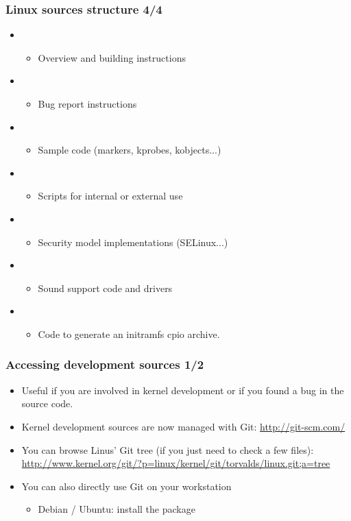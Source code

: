 \begin{frame}
  \frametitle{Linux sources structure 4/4}
  \begin{itemize}
  \item {}
    \begin{itemize}
    \item Overview and building instructions
    \end{itemize}
  \item {}
    \begin{itemize}
    \item Bug report instructions
    \end{itemize}
  \item {}
    \begin{itemize}
    \item Sample code (markers, kprobes, kobjects...)
    \end{itemize}
  \item {}
    \begin{itemize}
    \item Scripts for internal or external use
    \end{itemize}
  \item {}
    \begin{itemize}
    \item Security model implementations (SELinux...)
    \end{itemize}
  \item {}
    \begin{itemize}
    \item Sound support code and drivers
    \end{itemize}
  \item {}
    \begin{itemize}
    \item Code to generate an initramfs cpio archive.
    \end{itemize}
  \end{itemize}
\end{frame}

\begin{frame}
  \frametitle{Accessing development sources 1/2}
  \begin{itemize}
  \item Useful if you are involved in kernel development or if you
    found a bug in the source code.
  \item Kernel development sources are now managed with Git:
    \url{http://git-scm.com/}
  \item You can browse Linus' Git tree (if you just need to check a
    few files):
    \url{http://www.kernel.org/git/?p=linux/kernel/git/torvalds/linux.git;a=tree}
  \item You can also directly use Git on your workstation
    \begin{itemize}
    \item Debian / Ubuntu: install the  package
    \end{itemize}
  \end{itemize}
\end{frame}

